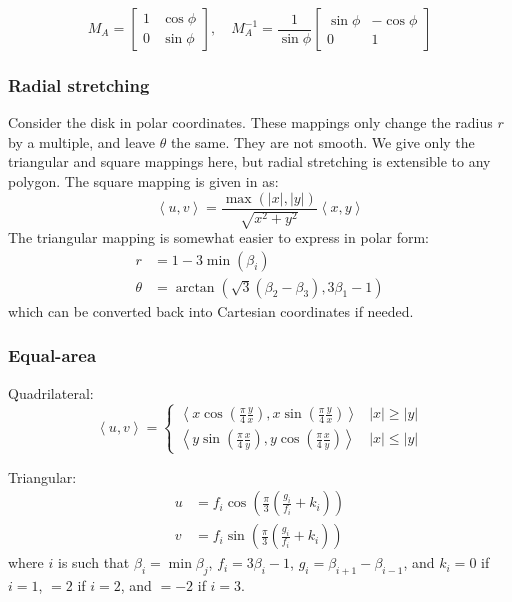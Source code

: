 \documentclass{amsart}[12pt]
\begin{document}
\begin{equation}
  M_A = \begin{bmatrix}
  1 & \cos \phi \\
  0 & \sin \phi  \end{bmatrix}, \quad
  M_A^{-1} = \frac{1}{\sin \phi}\begin{bmatrix}
  \sin \phi & -\cos \phi \\
  0 & 1 \end{bmatrix}
\end{equation}
\subsubsection{Radial stretching}
Consider the disk in polar coordinates. These mappings only change the radius
$r$ by a multiple, and leave $\theta$ the same. They are not smooth. We give
only the triangular and square mappings here, but radial stretching is
extensible to any polygon. The square mapping is given in \cite{fong15} as:
\begin{equation}
  \left<u, v \right> = \frac{\max(|x|,|y|)}{\sqrt{x^2+y^2}} \left<x,y\right>
\end{equation}
The triangular mapping is somewhat easier to express in polar form:
\begin{equation}\begin{split}
  r &= 1-3 \min( \beta_i ) \\
  \theta &= \arctan\left(\sqrt{3}(\beta_2-\beta_3),
  3\beta_1 - 1 \right)
\end{split}\end{equation}
which can be converted back into Cartesian coordinates if needed.

\subsubsection{Equal-area}
Quadrilateral:\cite{shirley}
\begin{equation}
\left<u, v \right> = \begin{cases}
\left<x \cos \left(\frac{\pi}{4} \frac{y}{x} \right),
x \sin \left(\frac{\pi}{4} \frac{y}{x} \right) \right> & |x| \ge |y| \\
\left<y \sin \left(\frac{\pi}{4} \frac{x}{y} \right),
y \cos \left(\frac{\pi}{4} \frac{x}{y} \right) \right> & |x| \le |y|
\end{cases}
\end{equation}

Triangular:
\begin{equation}\begin{split}
 u &= f_i \cos \left(\frac{\pi}{3}
 \left(\frac{g_i}{f_i} +k_i\right)\right) \\
 v & = f_i \sin \left(\frac{\pi}{3}
\left(\frac{g_i}{f_i} +k_i\right)\right)
\end{split}\end{equation}
where $i$ is such that $\beta_i = \min \beta_j$,  $f_i = 3 \beta_i - 1$,
$g_i = \beta_{i+1} - \beta_{i-1}$, and $k_i = 0$ if $i=1$,
$= 2$ if $i=2$, and $= -2$ if $i=3$.
\end{document}
